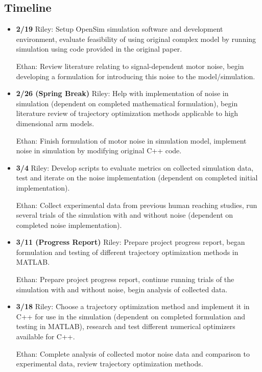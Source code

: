 \documentclass[table,12pt]{article}
\begin{document}
\subsection{Timeline}
\begin{itemize}
    \item \textbf{2/19} Riley: Setup OpenSim simulation software and development environment, evaluate feasibility of using original complex model by running simulation using code provided in the original paper.

    Ethan: Review literature relating to signal-dependent motor noise, begin developing a formulation for introducing this noise to the model/simulation.

    \item \textbf{2/26 (Spring Break)} Riley: Help with implementation of noise in simulation (dependent on completed mathematical formulation), begin literature review of trajectory optimization methods applicable to high dimensional arm models.

    Ethan: Finish formulation of motor noise in simulation model, implement noise in simulation by modifying original C++ code.

    \item \textbf{3/4} Riley: Develop scripts to evaluate metrics on collected simulation data, test and iterate on the noise implementation (dependent on completed initial implementation).

    Ethan: Collect experimental data from previous human reaching studies, run several trials of the simulation with and without noise (dependent on completed noise implementation).

    \item \textbf{3/11 (Progress Report)} Riley: Prepare project progress report, began formulation and testing of different trajectory optimization methods in MATLAB.

    Ethan: Prepare project progress report, continue running trials of the simulation with and without noise, begin analysis of collected data.

    \item \textbf{3/18} Riley: Choose a trajectory optimization method and implement it in C++ for use in the simulation (dependent on completed formulation and testing in MATLAB), research and test different numerical optimizers available for C++.

    Ethan: Complete analysis of collected motor noise data and comparison to experimental data, review trajectory optimization methods.


\end{itemize}
\end{document}
